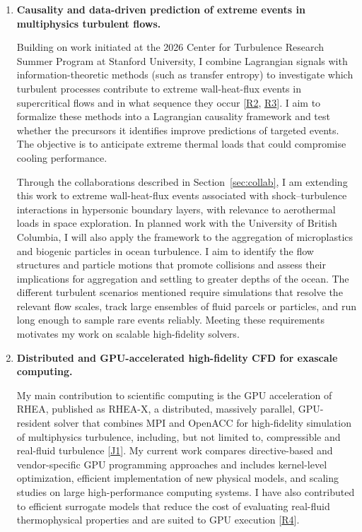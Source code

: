 \documentclass[11pt]{article}
\begin{document}
\begin{enumerate}[label=\textbf{\arabic*.}, leftmargin=*, itemsep=8pt]
	\item \textbf{Causality and data-driven prediction of extreme events in multiphysics turbulent flows.}
	
	Building on work initiated at the 2026 Center for Turbulence Research Summer Program at Stanford University, I combine Lagrangian signals with information-theoretic methods (such as transfer entropy) to investigate which turbulent processes contribute to extreme wall-heat-flux events in
	supercritical flows and in what sequence they occur	[\hyperlink{pub-R2}{R2}, \hyperlink{pub-R3}{R3}]. 
	I aim to formalize these methods into a Lagrangian causality framework and test whether the precursors	it identifies improve predictions of targeted events. The objective is to anticipate extreme thermal loads that could compromise cooling performance.
	
	Through the collaborations described in Section~\ref{sec:collab}, I am extending this work to extreme wall-heat-flux events associated with shock--turbulence interactions in hypersonic boundary layers, with relevance	to aerothermal loads in space exploration. In planned work with the University of British Columbia, I will also apply the framework to the aggregation
	of microplastics and biogenic particles in ocean turbulence. I aim to identify the flow structures and particle motions	that promote collisions and assess their implications for aggregation and	settling to greater depths of the ocean. 
	The different turbulent scenarios mentioned require simulations that resolve the relevant flow scales, track large ensembles of fluid parcels or particles, and run long enough to sample rare events reliably. Meeting these requirements motivates my work on scalable high-fidelity solvers.
	
	\item \textbf{Distributed and GPU-accelerated high-fidelity CFD for exascale computing.}
	
	My main contribution to scientific computing is the GPU acceleration of	RHEA, published as RHEA-X, a distributed, massively parallel, GPU-resident solver that combines MPI and OpenACC for high-fidelity simulation of multiphysics turbulence, including, but not limited to, compressible and real-fluid	turbulence [\hyperlink{pub-J1}{J1}]. My current work compares directive-based	and vendor-specific GPU programming approaches and includes kernel-level
	optimization, efficient implementation of new physical models, and scaling studies on large high-performance computing systems. I have also contributed	to efficient surrogate models that reduce the cost of evaluating real-fluid thermophysical properties and are suited to GPU execution [\hyperlink{pub-R4}{R4}].
	

\end{enumerate}
\end{document}
